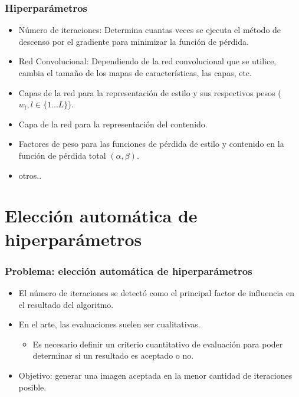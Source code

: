 \documentclass[10pt,center]{beamer}
\begin{document}
\begin{frame}
  \frametitle{Hiperparámetros}
  \begin{itemize}
   \item Número de iteraciones: Determina cuantas veces se ejecuta el método de descenso por el gradiente para minimizar la función de pérdida. 
   \item Red Convolucional: Dependiendo de la red convolucional que se utilice, cambia el tamaño de los mapas de características, las capas, etc.
   \item Capas de la red para la representación de estilo y sus respectivos pesos ($w_l, l \in \{1 \dots L\}$).
   \item Capa de la red para la representación del contenido.
   \item Factores de peso para las funciones de pérdida de estilo y contenido en la función de pérdida total $(\alpha, \beta)$.
   \item otros..
  \end{itemize}

\end{frame}


\section{Elección automática de hiperparámetros}
\begin{frame}
  \frametitle{Problema: elección automática de hiperparámetros}
  \begin{itemize}
   \item El número de iteraciones se detectó como el principal factor de influencia en el resultado del algoritmo.
   \item En el arte, las evaluaciones suelen ser cualitativas.
   \begin{itemize}
    \item Es necesario definir un criterio cuantitativo de evaluación para poder determinar si un resultado es aceptado o no.
   \end{itemize}
  \item Objetivo: generar una imagen aceptada en la menor cantidad de iteraciones posible.
  \end{itemize}

\end{frame}
\end{document}
